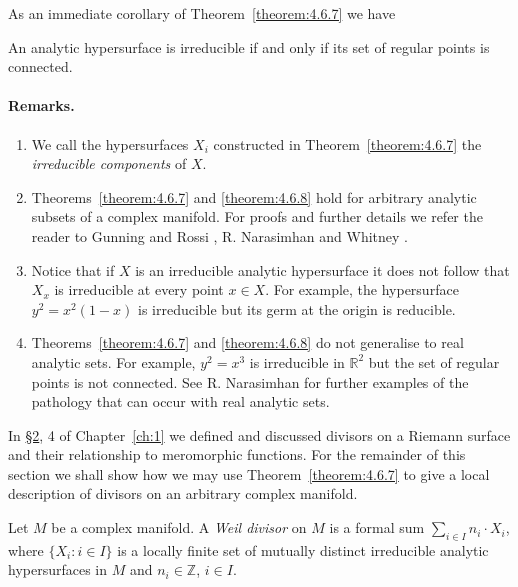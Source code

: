 As an immediate corollary of Theorem~\ref{theorem:4.6.7} we have

 An analytic hypersurface is irreducible if and only if its set of regular points is connected.

\paragraph*{Remarks.}
\begin{enumerate}
\item We call the hypersurfaces $X_i$ constructed in Theorem~\ref{theorem:4.6.7} the \emph{irreducible components} of $X$.
\item Theorems~\ref{theorem:4.6.7} and \ref{theorem:4.6.8} hold for arbitrary analytic subsets of a complex manifold. For proofs and further details we refer the reader to Gunning and Rossi \cite{bib:I:gunning-r-c-and-rossi-h:1}, R. Narasimhan \cite{bib:I:narasimhan-r:3} and Whitney \cite{bib:I:whitney-h:1}.
\item Notice that if $X$ is an irreducible analytic hypersurface it does not follow that $X_x$ is irreducible at every point $x\in X$. For example, the hypersurface $y^2=x^2(1-x)$ is irreducible but its germ at the origin is reducible.
\item Theorems~\ref{theorem:4.6.7} and \ref{theorem:4.6.8} do not generalise to real analytic sets. For example, $y^2=x^3$ is irreducible in $\mathbb R^2$ but the set of regular points is not connected. See R. Narasimhan \cite[Chapter V]{bib:I:narasimhan-r:3} for further examples of the pathology that can occur with real analytic sets.
\end{enumerate}
In \hyperref[sec:4:2]{\S2}, 4 of Chapter~\ref{ch:1} we defined and discussed divisors on a Riemann surface and their relationship to meromorphic functions. For the remainder of this section we shall show how we may use Theorem~\ref{theorem:4.6.7} to
give a local description of divisors on an arbitrary complex manifold.

 Let $M$ be a complex manifold. A \emph{Weil divisor} on $M$ is a formal sum $\sum_{i\in I}n_i\cdot X_i$, where $\{X_i:i\in I\}$ is a locally finite set of mutually distinct irreducible analytic hypersurfaces in $M$ and $n_i\in\mathbb Z$, $i\in I$.

